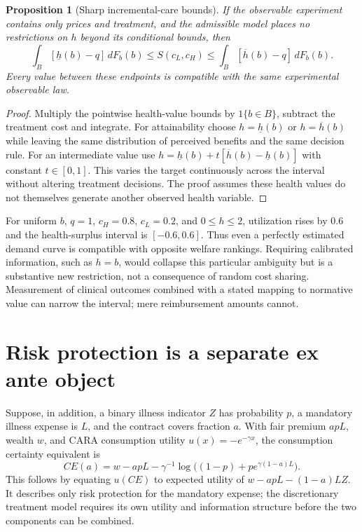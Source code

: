 \documentclass[11pt]{article}
\newtheorem{proposition}{Proposition}
\begin{document}
\begin{proposition}[Sharp incremental-care bounds]
If the observable experiment contains only prices and treatment, and the admissible model places no restrictions on $h$ beyond its conditional bounds, then
\[
 \int_B[\underline h(b)-q]\,dF_b(b)
 \leq S(c_L,c_H)\leq
 \int_B[\overline h(b)-q]\,dF_b(b).
\]
Every value between these endpoints is compatible with the same experimental observable law.
\end{proposition}
\begin{proof}
Multiply the pointwise health-value bounds by $1\{b\in B\}$, subtract the treatment cost and integrate. For attainability choose $h=\underline h(b)$ or $h=\overline h(b)$ while leaving the same distribution of perceived benefits and the same decision rule. For an intermediate value use $h=\underline h(b)+t[\overline h(b)-\underline h(b)]$ with constant $t\in[0,1]$. This varies the target continuously across the interval without altering treatment decisions. The proof assumes these health values do not themselves generate another observed health variable.
\end{proof}

For uniform $b$, $q=1$, $c_H=0.8$, $c_L=0.2$, and $0\leq h\leq2$, utilization rises by $0.6$ and the health-surplus interval is $[-0.6,0.6]$. Thus even a perfectly estimated demand curve is compatible with opposite welfare rankings. Requiring calibrated information, such as $h=b$, would collapse this particular ambiguity but is a substantive new restriction, not a consequence of random cost sharing. Measurement of clinical outcomes combined with a stated mapping to normative value can narrow the interval; mere reimbursement amounts cannot.

\section*{Risk protection is a separate ex ante object}
Suppose, in addition, a binary illness indicator $Z$ has probability $p$, a mandatory illness expense is $L$, and the contract covers fraction $a$. With fair premium $apL$, wealth $w$, and CARA consumption utility $u(x)=-e^{-\gamma x}$, the consumption certainty equivalent is
\[
 CE(a)=w-apL-\gamma^{-1}\log\bigl((1-p)+p e^{\gamma(1-a)L}\bigr).
\]
This follows by equating $u(CE)$ to expected utility of $w-apL-(1-a)LZ$. It describes only risk protection for the mandatory expense; the discretionary treatment model requires its own utility and information structure before the two components can be combined.
\end{document}
